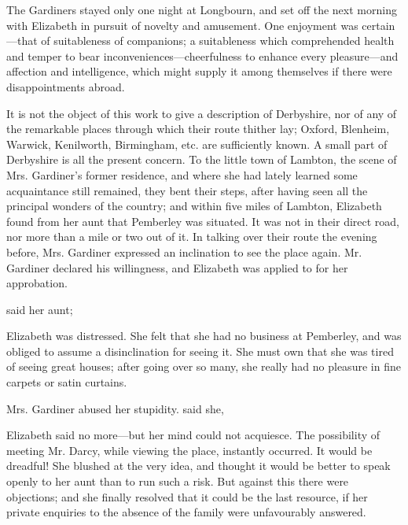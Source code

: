 The Gardiners stayed only one night at Longbourn, and set off the next morning with Elizabeth in pursuit of novelty and amusement. One enjoyment was certain---that of suitableness of companions; a suitableness which comprehended health and temper to bear inconveniences---cheerfulness to enhance every pleasure---and affection and intelligence, which might supply it among themselves if there were disappointments abroad.

It is not the object of this work to give a description of Derbyshire, nor of any of the remarkable places through which their route thither lay; Oxford, Blenheim, Warwick, Kenilworth, Birmingham, etc. are sufficiently known. A small part of Derbyshire is all the present concern. To the little town of Lambton, the scene of Mrs. Gardiner's former residence, and where she had lately learned some acquaintance still remained, they bent their steps, after having seen all the principal wonders of the country; and within five miles of Lambton, Elizabeth found from her aunt that Pemberley was situated. It was not in their direct road, nor more than a mile or two out of it. In talking over their route the evening before, Mrs. Gardiner expressed an inclination to see the place again. Mr. Gardiner declared his willingness, and Elizabeth was applied to for her approbation.

 said her aunt; 

Elizabeth was distressed. She felt that she had no business at Pemberley, and was obliged to assume a disinclination for seeing it. She must own that she was tired of seeing great houses; after going over so many, she really had no pleasure in fine carpets or satin curtains.

Mrs. Gardiner abused her stupidity.  said she, 

Elizabeth said no more---but her mind could not acquiesce. The possibility of meeting Mr. Darcy, while viewing the place, instantly occurred. It would be dreadful! She blushed at the very idea, and thought it would be better to speak openly to her aunt than to run such a risk. But against this there were objections; and she finally resolved that it could be the last resource, if her private enquiries to the absence of the family were unfavourably answered.

